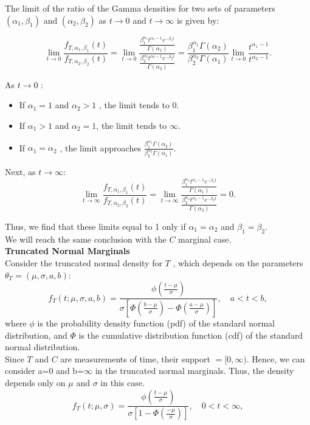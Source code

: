The limit of the ratio of the Gamma densities for two sets of parameters  $(\alpha_1, \beta_1)$  and  $(\alpha_2, \beta_2)$  as  $t \to 0$ and  $t \to \infty$ is given by:


$$\lim_{t \to 0} \frac{f_{T, \alpha_1, \beta_1}(t)}{f_{T, \alpha_2, \beta_2}(t)} = \lim_{t \to 0} \frac{\frac{\beta_1^{\alpha_1} t^{\alpha_1 - 1} e^{-\beta_1 t}}{\Gamma(\alpha_1)}}{\frac{\beta_2^{\alpha_2} t^{\alpha_2 - 1} e^{-\beta_2 t}}{\Gamma(\alpha_2)}} = \frac{\beta_1^{\alpha_1} \Gamma(\alpha_2)}{\beta_2^{\alpha_2} \Gamma(\alpha_1)} \lim_{t \to 0} \frac{t^{\alpha_1 - 1}}{t^{\alpha_2 - 1}}.$$


As  $t \to 0$ :
\begin{itemize}
	\item If  $\alpha_1 = 1$  and  $\alpha_2 > 1$ , the limit tends to  0.
	\item If  $\alpha_1 > 1$  and  $\alpha_2 = 1$, the limit tends to  $\infty$.
	\item If  $\alpha_1 = \alpha_2$ , the limit approaches  $\frac{\beta_1^{\alpha_1} \Gamma(\alpha_2)}{\beta_2^{\alpha_2} \Gamma(\alpha_1)}$.
\end{itemize}

Next, as $ t \to \infty$:
$$\lim_{t \to \infty} \frac{f_{T, \alpha_1, \beta_1}(t)}{f_{T, \alpha_2, \beta_2}(t)} = \lim_{t \to \infty} \frac{\frac{\beta_1^{\alpha_1} t^{\alpha_1 - 1} e^{-\beta_1 t}}{\Gamma(\alpha_1)}}{\frac{\beta_2^{\alpha_2} t^{\alpha_2 - 1} e^{-\beta_2 t}}{\Gamma(\alpha_2)}} = 0.$$


Thus, we find that these limits equal to  1  only if  $\alpha_1 = \alpha_2$  and  $\beta_1 = \beta_2$.\\
We will reach the same conclusion with the $C$ marginal case.\\
\textbf{Truncated Normal Marginals}\\
Consider the truncated normal density for $T$ , which depends on the parameters  $\theta_T = (\mu, \sigma, a, b)$:
\begin{equation*}
	f_T(t; \mu, \sigma, a, b) = \frac{\phi\left(\frac{t - \mu}{\sigma}\right)}{\sigma \left[\Phi\left(\frac{b - \mu}{\sigma}\right) - \Phi\left(\frac{a - \mu}{\sigma}\right)\right]}, \quad a < t < b,
\end{equation*}
where  $\phi$ is the probability density function (pdf) of the standard normal distribution, and  $\Phi$  is the cumulative distribution function (cdf) of the standard normal distribution.\\
Since $T$ and $C$ are measurements of time, their support $= [0, \infty)$. Hence, we can consider a=0 and b=$\infty$ in the truncated normal marginals. Thus, the density depends only on $\mu$ and $\sigma$ in this case.
\begin{equation*}
	f_T(t; \mu, \sigma) = \frac{\phi\left(\frac{t - \mu}{\sigma}\right)}{\sigma \left[1 - \Phi\left(\frac{- \mu}{\sigma}\right)\right]}, \quad 0 < t < \infty,
\end{equation*}

